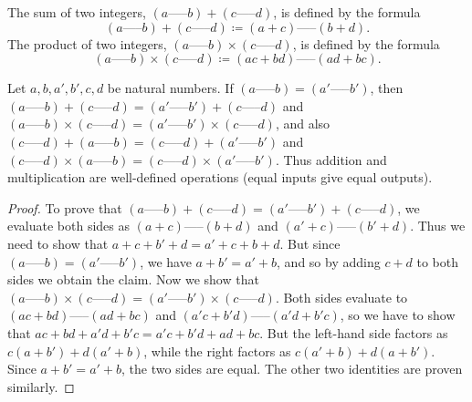 \begin{definition}\label{4.1.2}
    The sum of two integers, \((a \text{-----} b) + (c \text{-----} d)\), is defined by the formula
    \[
        (a \text{-----} b) + (c \text{-----} d) \coloneqq (a + c) \text{-----} (b + d).
    \]
    The product of two integers, \((a \text{-----} b) \times (c \text{-----} d)\), is defined by the formula
    \[
        (a \text{-----} b) \times (c \text{-----} d) \coloneqq (ac + bd) \text{-----} (ad + bc).
    \]
\end{definition}

\begin{lemma}\label{4.1.3}
    Let \(a, b, a', b', c, d\) be natural numbers.
    If \((a \text{-----} b) = (a' \text{-----} b')\), then \((a \text{-----} b) + (c \text{-----} d) = (a' \text{-----} b') + (c \text{-----} d)\) and \((a \text{-----} b) \times (c \text{-----} d) = (a' \text{-----} b') \times (c \text{-----} d)\), and also \((c \text{-----} d) + (a \text{-----} b) = (c \text{-----} d) + (a' \text{-----} b')\) and \((c \text{-----} d) \times (a \text{-----} b) = (c \text{-----} d) \times (a' \text{-----} b')\).
    Thus addition and multiplication are well-defined operations (equal inputs give equal outputs).
\end{lemma}

\begin{proof}
    To prove that \((a \text{-----} b) + (c \text{-----} d) = (a' \text{-----} b') + (c \text{-----} d)\), we evaluate both sides as \((a + c) \text{-----} (b + d)\) and \((a' + c) \text{-----} (b' + d)\).
    Thus we need to show that \(a + c + b' + d = a' + c + b + d\).
    But since \((a \text{-----} b) = (a' \text{-----} b')\), we have \(a + b' = a' + b\), and so by adding \(c + d\) to both sides we obtain the claim.
    Now we show that \((a \text{-----} b) \times (c \text{-----} d) = (a' \text{-----} b') \times (c \text{-----} d)\).
    Both sides evaluate to \((ac + bd) \text{-----} (ad + bc)\) and \((a'c + b'd) \text{-----} (a'd + b'c)\), so we have to show that \(ac + bd + a'd + b'c = a'c + b'd + ad + bc\).
    But the left-hand side factors as \(c(a + b') + d(a' + b)\), while the right factors as \(c(a' + b) + d(a + b')\).
    Since \(a + b' = a' + b\), the two sides are equal.
    The other two identities are proven similarly.
\end{proof}

